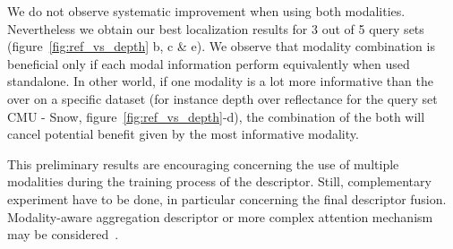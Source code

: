 We do not observe systematic improvement when using both modalities. Nevertheless we obtain our best localization results for 3 out of 5 query sets (figure~\ref{fig:ref_vs_depth} b, c \& e). We observe that modality combination is beneficial only if each modal information perform equivalently when used standalone. In other world, if one modality is a lot more informative than the over on a specific dataset (for instance depth over reflectance for the query set CMU - Snow, figure~\ref{fig:ref_vs_depth}-d), the combination of the both will cancel potential benefit given by the most informative modality.

This preliminary results are encouraging concerning the use of multiple modalities during the training process of the descriptor. Still, complementary experiment have to be done, in particular concerning the final descriptor fusion. Modality-aware aggregation descriptor or more complex attention mechanism may be considered~\cite{Seymour2018}.


